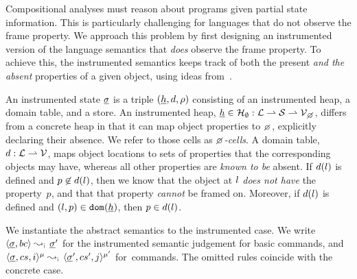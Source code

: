Compositional analyses must reason about programs given partial state information.
This is particularly challenging for languages that do not observe the frame property.
We approach this problem by first designing an instrumented version of the language semantics that \emph{does} 
observe the frame property. 
%
To achieve this, the \jsil instrumented semantics keeps track of both the present \emph{and the absent} properties of a given object, 
using ideas from~\cite{gardner:popl:2012,javert}.

An instrumented state $\underline{\sigma}$ is a triple $(\underline{h}, d, \rho)$ consisting of an instrumented heap, 
a domain table, and a store. 
%
An instrumented heap, $\iheap \in \iheaps : \locs \partialmap \strings \partialmap \setext{\vals}{\none}$, 
differs from a concrete heap in that it can map object properties to $\none$, explicitly declaring their absence. 
We refer to those cells as \emph{$\none$-cells}. 
%
A domain table, $d : {\mathcal L} \rightharpoonup \mathcal{V}$, maps object locations to sets of properties that the corresponding objects may have, whereas all other properties are \emph{known to be} absent. 
If $d(l)$ is defined and $p \not\in d(l)$, then we know that the object at $l$ \emph{does not have} the property~$p$, and that that property \emph{cannot} be framed on. 
Moreover, if $d(l)$ is defined and $(l, p) \in \texttt{dom}(\underline{h})$, then $p \in d(l)$.


We instantiate the abstract semantics to the instrumented case. 
We write $\absbsemrule{\istate, \bcmd}{\istate'}{\instrumented}$ for the instrumented semantic 
judgement for basic commands, and $\abssemrule{\istate, \cs, i}{\istate', \cs', j}{\mode}{\mode'}{\instrumented}$ 
for~commands. The omitted rules coincide with the concrete case. 


